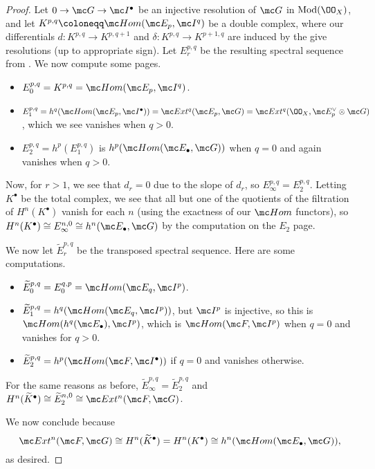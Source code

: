 \documentclass[../notes.tex]{subfiles}
\begin{document}
\begin{proof}
	Let $0\to\mc G\to\mc I^\bullet$ be an injective resolution of $\mc G$ in $\mathrm{Mod}(\OO_X)$, and let $K^{p,q}\coloneqq\mc Hom(\mc E_p,\mc I^q)$ be a double complex, where our differentials $d\colon K^{p,q}\to K^{p,q+1}$ and $\delta\colon K^{p,q}\to K^{p+1,q}$ are induced by the give resolutions (up to appropriate sign). Let $E_r^{p,q}$ be the resulting spectral sequence from . We now compute some pages.
	\begin{itemize}
		\item $E_0^{p,q}=K^{p,q}=\mc Hom(\mc E_p,\mc I^q)$.
		\item $E_1^{p,q}=h^q(\mc Hom(\mc E_p,\mc I^\bullet))=\mc Ext^q(\mc E_p,\mc G)=\mc Ext^q(\OO_X,\mc E_p^\lor\otimes\mc G)$, which we see vanishes when $q>0$.
		\item $E_2^{p,q}=h^p(E_1^{p,q})$ is $h^p(\mc Hom(\mc E_\bullet,\mc G))$ when $q=0$ and again vanishes when $q>0$.
	\end{itemize}
	Now, for $r>1$, we see that $d_r=0$ due to the slope of $d_r$, so $E_\infty^{p,q}=E_2^{p,q}$. Letting $K^\bullet$ be the total complex, we see that all but one of the quotients of the filtration of $H^n(K^\bullet)$ vanish for each $n$ (using the exactness of our $\mc Hom$ functors), so $H^n(K^\bullet)\cong E^{n,0}_\infty\cong h^n(\mc E_\bullet,\mc G)$ by the computation on the $E_2$ page.

	We now let $\widetilde E_r^{p,q}$ be the transposed spectral sequence. Here are some computations.
	\begin{itemize}
		\item $\widetilde E_0^{p,q}=E_0^{q,p}=\mc Hom(\mc E_q,\mc I^p)$.
		\item $\widetilde E_1^{p,q}=h^q(\mc Hom(\mc E_q,\mc I^p))$, but $\mc I^p$ is injective, so this is $\mc Hom(h^q(\mc E_\bullet),\mc I^p)$, which is $\mc Hom(\mc F,\mc I^p)$ when $q=0$ and vanishes for $q>0$.
		\item $\widetilde E_2^{p,q}=h^p(\mc Hom(\mc F,\mc I^\bullet))$ if $q=0$ and vanishes otherwise.
	\end{itemize}
	For the same reasons as before, $\widetilde E^{p,q}_\infty=\widetilde E^{p,q}_2$ and $H^n(\widetilde K^\bullet)\cong\widetilde E_2^{n,0}\cong\mc Ext^n(\mc F,\mc G)$.

	We now conclude because
	\[\mc Ext^n(\mc F,\mc G)\cong H^n(\widetilde K^\bullet)=H^n(K^\bullet)\cong h^n(\mc Hom(\mc E_\bullet,\mc G)),\]
	as desired.
\end{proof}
\end{document}
